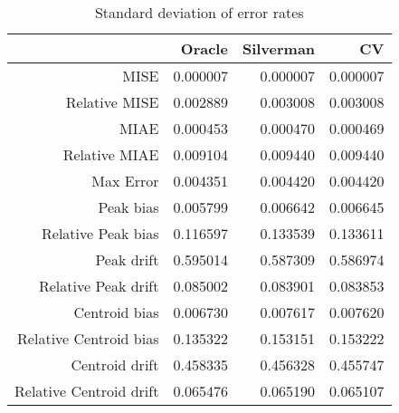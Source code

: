 \begin{table}[ht]
\centering
\begin{tabular}{rrrr}
  \hline
 & Oracle & Silverman & CV \\ 
  \hline
MISE & 0.000007 & 0.000007 & 0.000007 \\ 
  Relative MISE & 0.002889 & 0.003008 & 0.003008 \\ 
  MIAE & 0.000453 & 0.000470 & 0.000469 \\ 
  Relative MIAE & 0.009104 & 0.009440 & 0.009440 \\ 
  Max Error & 0.004351 & 0.004420 & 0.004420 \\ 
  Peak bias & 0.005799 & 0.006642 & 0.006645 \\ 
  Relative Peak bias & 0.116597 & 0.133539 & 0.133611 \\ 
  Peak drift & 0.595014 & 0.587309 & 0.586974 \\ 
  Relative Peak drift & 0.085002 & 0.083901 & 0.083853 \\ 
  Centroid bias & 0.006730 & 0.007617 & 0.007620 \\ 
  Relative Centroid bias & 0.135322 & 0.153151 & 0.153222 \\ 
  Centroid drift & 0.458335 & 0.456328 & 0.455747 \\ 
  Relative Centroid drift & 0.065476 & 0.065190 & 0.065107 \\ 
   \hline
\end{tabular}
\caption{Standard deviation of error rates} 
\label{tbl:stddev_error_rates}
\end{table}
